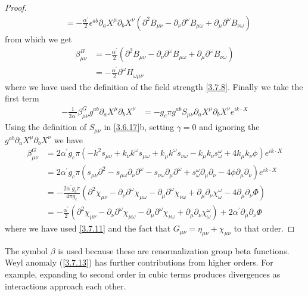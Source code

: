 \begin{tcolorbox}[breakable]
\begin{proof}
\begin{align}
		&= -\frac{\alpha^{\prime}}{2} \epsilon^{a b} \partial_a X^\mu \partial_b X^\nu\left(\partial^2 B_{\mu \nu} - \partial_\nu \partial^\omega B_{\mu \omega} + \partial_\mu \partial^\omega B_{\nu \omega}\right)
	\end{align}
	from which we get
	\begin{align}
		\beta_{\mu \nu}^B &= -\frac{\alpha^{\prime}}{2}\left(\partial^2 B_{\mu \nu} - \partial_\nu \partial^\omega B_{\mu \omega} + \partial_\mu \partial^\omega B_{\nu \omega}\right) \nonumber \\
		&= -\frac{\alpha^{\prime}}{2} \partial^\omega H_{\omega \mu \nu}
	\end{align}
	where we have used the definition of the field strength \eqref{3.7.8}. Finally we take the first term
	\begin{align}
		-\frac{1}{2 \alpha^{\prime}} \beta_{\mu \nu}^G g^{a b} \partial_a X^\mu \partial_b X^\nu &= -g_c \pi g^{a b} S_{\mu \nu} \partial_a X^\mu \partial_b X^\nu e^{i k \cdot X}
	\end{align}
	Using the definition of $S_{\mu \nu}$ in \eqref{3.6.17}b, setting $\gamma=0$ and ignoring the $g^{a b} \partial_a X^\mu \partial_b X^\nu$ we have
	\begin{align}
		\beta_{\mu \nu}^G &= 2 \alpha^{\prime} g_c \pi\left(-k^2 s_{\mu \nu} + k_\nu k^\omega s_{\mu \omega} + k_\mu k^\omega s_{\nu \omega} - k_\mu k_\nu s_\omega^\omega + 4 k_\mu k_\nu \phi\right) e^{i k \cdot X} \nonumber \\
		&= 2 \alpha^{\prime} g_c \pi\left(s_{\mu \nu} \partial^2 - s_{\mu \omega} \partial_\nu \partial^\omega - s_{\nu \omega} \partial_\mu \partial^\omega + s_\omega^\omega \partial_\mu \partial_\nu - 4 \phi \partial_\mu \partial_\nu\right) e^{i k \cdot X} \nonumber \\
		&= -\frac{2 \alpha^{\prime} g_c \pi}{4 \pi g_c}\left(\partial^2 \chi_{\mu \nu} - \partial_\nu \partial^\omega \chi_{\mu \omega} - \partial_\mu \partial^\omega \chi_{\nu \omega} + \partial_\mu \partial_\nu \chi_\omega^\omega - 4 \partial_\mu \partial_\nu \Phi\right) \nonumber \\
		&= -\frac{\alpha^{\prime}}{2}\left(\partial^2 \chi_{\mu \nu} - \partial_\nu \partial^\omega \chi_{\mu \omega} - \partial_\mu \partial^\omega \chi_{\nu \omega} + \partial_\mu \partial_\nu \chi_\omega^\omega\right) + 2 \alpha^{\prime} \partial_\mu \partial_\nu \Phi
	\end{align}
	where we have used \eqref{3.7.11} and the fact that $G_{\mu \nu} = \eta_{\mu \nu} + \chi_{\mu \nu}$ to that order.
	
	\end{proof}
\end{tcolorbox}
The symbol $\beta$ is used because these are renormalization group beta functions. Weyl anomaly (\ref{3.7.13}) has further contributions from higher orders. For example, expanding to second order in cubic terms produces divergences as interactions approach each other.

